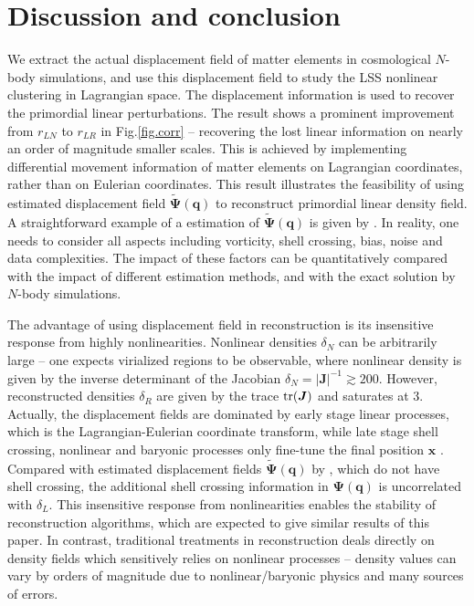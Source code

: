 \documentclass[aps,prd,twocolumn,superscriptaddress,amsfont,amssymb,amsmath,nofootinbib,showpacs,balancelastpage]{revtex4-1}
\newcommand{\bs}{\boldsymbol}
\begin{document}
\section{Discussion and conclusion}\label{sec.discussion}
We extract the actual displacement field of matter elements in cosmological $N$-body
simulations, and use this displacement field to study the LSS nonlinear
clustering in Lagrangian space. The displacement information is used to recover
the primordial linear perturbations. The result shows a prominent improvement from
$r_{LN}$ to $r_{LR}$ in Fig.\ref{fig.corr} -- recovering the lost linear information on
nearly an order of magnitude smaller scales.
This is achieved by implementing differential movement information
of matter elements on Lagrangian coordinates, rather than on
Eulerian coordinates. This result illustrates the feasibility
of using estimated displacement field $\tilde{\bs \Psi}(\bs q)$
to reconstruct primordial linear density field.
A straightforward example of a estimation of $\tilde{\bs \Psi}(\bs q)$
is given by \cite{1995ApJS..100..269P,1998ApJS..115...19P}.
In reality, one needs
to consider all aspects including vorticity, shell crossing, bias, noise
and data complexities. The impact of these factors can be quantitatively
compared with the impact of different estimation methods, and with
the exact solution by $N$-body simulations.

The advantage of using displacement field in reconstruction is
its insensitive response from highly nonlinearities.
Nonlinear densities $\delta_N$ can be arbitrarily large -- 
one expects virialized regions to be observable, where nonlinear
density is given by the inverse determinant of the Jacobian
$\delta_N=|\bs J|^{-1}\gtrsim 200$.
However, reconstructed densities $\delta_R$ are given by
the trace $\rm{tr}(\bs J)$ and saturates at 3.
Actually, the displacement fields are dominated by early stage linear processes,
which is the Lagrangian-Eulerian coordinate transform,
while late stage shell crossing, nonlinear and baryonic processes
only fine-tune the final position $\bs x$
\citep{2014PhRvD..89h3515C}. Compared with estimated displacement fields $\tilde{\bs \Psi}(\bs q)$
by \cite{1995ApJS..100..269P}, which do not have shell crossing,
the additional shell crossing information in $\bs\Psi(\bs q)$
is uncorrelated with $\delta_L$. This insensitive response from
nonlinearities enables the stability of reconstruction algorithms,
which are expected to give similar results of this paper. 
In contrast, traditional
treatments in reconstruction deals directly on density fields which sensitively
relies on nonlinear processes --  density values can vary by orders
of magnitude due to nonlinear/baryonic physics and many sources of errors.
\end{document}
